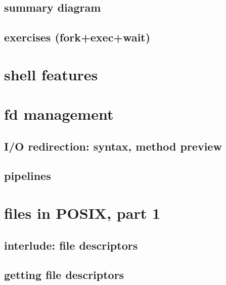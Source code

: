 


\subsection{summary diagram}




\subsection{exercises (fork+exec+wait)}




\section{shell features}


\section{fd management}
\subsection{I/O redirection: syntax, method preview}


\subsection{pipelines}


\section{files in POSIX, part 1}

\subsection{interlude: file descriptors}





\subsection{getting file descriptors}


